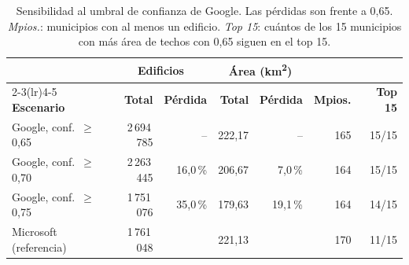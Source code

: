 \begin{table}[H]
\centering\small
\caption{Sensibilidad al umbral de confianza de Google. Las pérdidas son frente a 0,65. \emph{Mpios.}: municipios con al menos un edificio. \emph{Top 15}: cuántos de los 15 municipios con más área de techos con 0,65 siguen en el top 15.}
\label{tab:sensibilidad}
\begin{tabular}{@{}lrrrrrr@{}}
\toprule
 & \multicolumn{2}{c}{\textbf{Edificios}} & \multicolumn{2}{c}{\textbf{Área (km\textsuperscript{2})}} & & \\
\cmidrule(lr){2-3}\cmidrule(lr){4-5}
\textbf{Escenario} & \textbf{Total} & \textbf{Pérdida} & \textbf{Total} & \textbf{Pérdida} & \textbf{Mpios.} & \textbf{Top 15} \\
\midrule
Google, conf.\ $\geq$ 0,65 & 2\,694\,785 & -- & 222,17 & -- & 165 & 15/15 \\
Google, conf.\ $\geq$ 0,70 & 2\,263\,445 & 16,0\,\% & 206,67 & 7,0\,\% & 164 & 15/15 \\
Google, conf.\ $\geq$ 0,75 & 1\,751\,076 & 35,0\,\% & 179,63 & 19,1\,\% & 164 & 14/15 \\
\midrule
Microsoft (referencia) & 1\,761\,048 &  & 221,13 &  & 170 & 11/15 \\
\bottomrule
\end{tabular}
\end{table}
